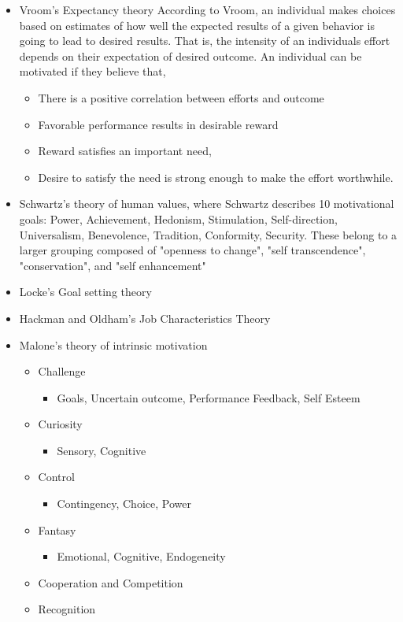 \documentclass[conference]{IEEEtran}
\begin{document}
\begin{itemize}
\item
  Vroom's Expectancy theory \cite{vroom1959some} According to Vroom,
  an individual makes choices based on estimates of how well the
  expected results of a given behavior is going to lead to desired
  results. That is, the intensity of an individuals effort depends on
  their expectation of desired outcome. An individual can be motivated
  if they believe that,

  \begin{itemize}
  \item
    There is a positive correlation between efforts and outcome
  \item
    Favorable performance results in desirable reward
  \item
    Reward satisfies an important need,
  \item
    Desire to satisfy the need is strong enough to make the effort
    worthwhile.
  \end{itemize}
\item Schwartz's theory of human values, where Schwartz describes 10 motivational goals:
  Power, Achievement, Hedonism, Stimulation, Self-direction, Universalism, Benevolence, Tradition, Conformity, Security. These belong to a larger grouping composed of "openness to change", "self transcendence", "conservation", and "self enhancement"
\item Locke's Goal setting theory
\item Hackman and Oldham's Job Characteristics Theory
\item Malone's theory of intrinsic motivation \cite{malone1987making}

  \begin{itemize}
  \item
    Challenge

    \begin{itemize}
    \item
      Goals, Uncertain outcome, Performance Feedback, Self Esteem
    \end{itemize}
  \item
    Curiosity

    \begin{itemize}
    \item
      Sensory, Cognitive
    \end{itemize}
  \item
    Control

    \begin{itemize}
    \item
      Contingency, Choice, Power
    \end{itemize}
  \item
    Fantasy

    \begin{itemize}
    \item
      Emotional, Cognitive, Endogeneity
    \end{itemize}
  \item
    Cooperation and Competition
  \item
    Recognition
  \end{itemize}
\end{itemize}
\end{document}
